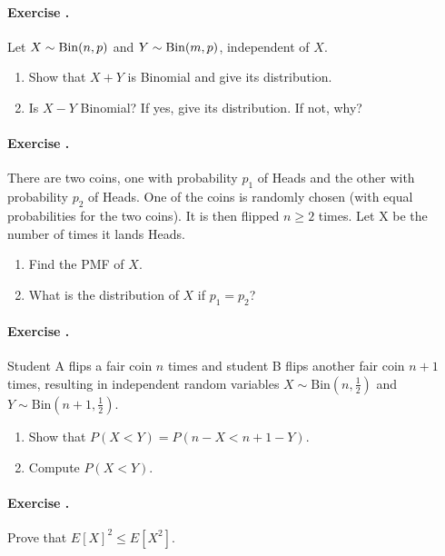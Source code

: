 \documentclass[12pt,a4paper]{article}
\newcounter{num}  %
\begin{document}
	
	\paragraph{Exercise \thenum.}
	Let $X \sim {\rm Bin}(n, p)$ and $Y \sim {\rm Bin}(m, p)$, independent of $X$.
	\begin{enumerate}
		\item  Show that $X+Y$ is Binomial and give its distribution.
	\item  Is $X-Y$ Binomial? If yes, give its distribution. If not, why?
	\end{enumerate}
	
	\paragraph{Exercise \thenum.}
	There are two coins, one with probability $p_1$ of Heads and the other with probability $p_2$ of Heads. 
	One of the coins is randomly chosen (with equal probabilities for the two coins). 
	It is then flipped $n \geq 2$ times. 
	Let X be the number of times it lands Heads.
	\begin{enumerate}
		\item Find the PMF of $X$.
		\item What is the distribution of $X$ if $p_1 = p_2$?
		\end{enumerate}
	
	
	
	\paragraph{Exercise \thenum.}
	Student A flips a fair coin \(n\) times and student B flips another fair coin \(n+1\) times, resulting in independent random variables \( X \sim \text{Bin}(n, \frac{1}{2}) \) and \( Y \sim \text{Bin}(n+1, \frac{1}{2}) \).
	
	
	\begin{enumerate}
		\item Show that \( P(X < Y) = P(n - X < n + 1 - Y) \).
	
	\item Compute \( P(X < Y) \).
	\end{enumerate}
	
	
	
	\paragraph{Exercise \thenum.}
	Prove that $E[X]^2\leq E[X^2]$. %
	
\end{document}
